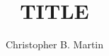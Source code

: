 \documentclass[12pt,twoside,final]{thesis}
\begin{document}
\title{TITLE}
\author{Christopher B. Martin}
\dissertation
\doctorphilosophy
\copyrightnotice





%





\begin{vita}
%
\end{vita}
\end{document}
